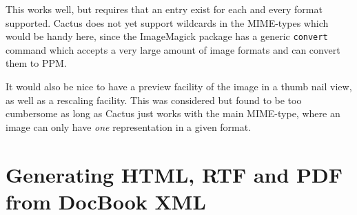 This works well, but requires that an entry exist for each and every
format supported.  Cactus does not yet support wildcards in the
MIME-types which would be handy here, since the ImageMagick package
has a generic \texttt{convert} command which accepts a very large
amount of image formats and can convert them to PPM.

It would also be nice to have a preview facility of the image in a
thumb nail view, as well as a rescaling facility.  This was considered
but found to be too cumbersome as long as Cactus just works with the
main MIME-type, where an image can only have \textit{one}
representation in a given format.

\section{Generating HTML, RTF and PDF from DocBook XML}
\label{sec:xml-publishing}








